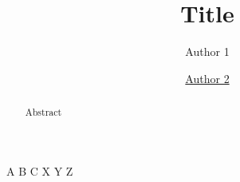 \documentclass[superscriptaddress]{revtex4-2}
\begin{document}

\title{Title}

\author{Author 1}
\author{\underline{Author 2}} %

\begin{abstract}
  Abstract
\end{abstract}

\maketitle

\begin{thebibliography}{}
 A B C
 X Y Z
\end{thebibliography}
\end{document}
